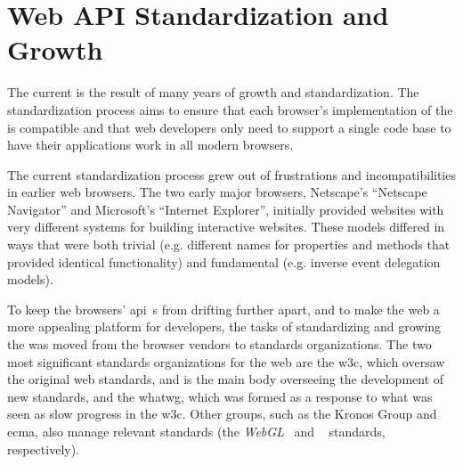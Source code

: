 \section{Web API Standardization and Growth}
\label{background:webapi-growth}

The current \WAPI is the result of many years of growth and standardization.
The standardization process aims to ensure that each browser's implementation
of the \WAPI is compatible and that web developers only need to support a
single code base to have their applications work in all modern browsers.

The current standardization process grew out of frustrations and incompatibilities
in earlier web browsers.  The two early major browsers, Netscape's ``Netscape
Navigator'' and Microsoft's ``Internet Explorer'', initially provided websites
with very different systems for building interactive websites.  These
models differed in ways that were both trivial
(e.g. different names for properties and methods that provided identical
functionality) and fundamental (e.g. inverse event delegation models).

To keep the browsers' \gls{api}~s from drifting further apart, and
to make the web a more appealing platform for developers,
the tasks of standardizing and growing the \WAPI was moved from the browser
vendors to standards organizations.  The two most significant standards
organizations for the web are the \gls{w3c}, which oversaw the original web
standards, and is the main body overseeing the development of new \WAPI
standards, and the \gls{whatwg}, which was formed as a response to what was seen
as slow progress in the \gls{w3c}.  Other groups, such as the Kronos Group and
\gls{ecma}, also manage relevant standards (the
\textit{WebGL}~\cite{webgl2015standard} and \textit{\JS}~\cite{ecmascript}
standards, respectively).
